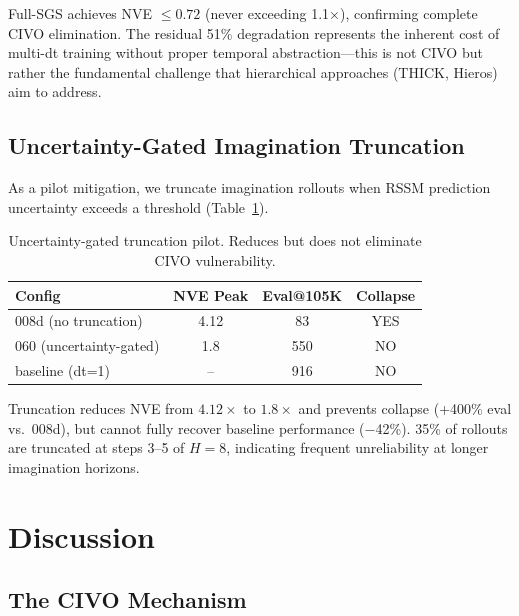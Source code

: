 \documentclass[10pt,letterpaper]{article}
\begin{document}
Full-SGS achieves NVE $\leq 0.72$ (never exceeding 1.1$\times$), confirming complete CIVO elimination.
The residual 51\% degradation represents the inherent cost of multi-dt training without proper temporal abstraction---this is not CIVO but rather the fundamental challenge that hierarchical approaches (THICK, Hieros) aim to address.

\subsection{Uncertainty-Gated Imagination Truncation}
\label{sec:truncation}

As a pilot mitigation, we truncate imagination rollouts when RSSM prediction uncertainty exceeds a threshold (Table~\ref{tab:truncation}).

\begin{table}[h]
\centering
\caption{Uncertainty-gated truncation pilot. Reduces but does not eliminate CIVO vulnerability.}
\label{tab:truncation}
\begin{tabular}{lccc}
\toprule
Config & NVE Peak & Eval@105K & Collapse \\
\midrule
008d (no truncation) & 4.12 & 83 & YES \\
060 (uncertainty-gated) & 1.8 & 550 & NO \\
baseline (dt=1) & -- & 916 & NO \\
\bottomrule
\end{tabular}
\end{table}

Truncation reduces NVE from $4.12\times$ to $1.8\times$ and prevents collapse (+400\% eval vs.\ 008d), but cannot fully recover baseline performance ($-$42\%).
35\% of rollouts are truncated at steps 3--5 of $H=8$, indicating frequent unreliability at longer imagination horizons.

\section{Discussion}

\subsection{The CIVO Mechanism}
\end{document}
